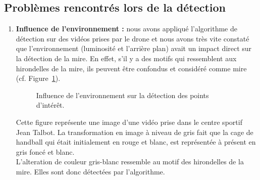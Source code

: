 \documentclass[12pt]{article}
\begin{document}
\subsection{Problèmes rencontrés lors de la détection}
\begin{enumerate}
        \item \textbf{Influence de l’environnement :}
nous avons appliqué l’algorithme de détection sur des vidéos prises par le drone et nous avons très vite constaté que l’environnement (luminosité et  l’arrière plan) avait un impact direct sur la détection de la mire. En effet, s’il y a des motifs qui ressemblent aux hirondelles de la mire, ils peuvent être confondus et considéré comme mire (cf. Figure~\ref{fig:environnement}).\\
\begin{figure}[H]
    \centering
    \qquad
    \caption{Influence de l'environnement sur la détection des points d'intérêt.}
    \label{fig:environnement}
\end{figure}

Cette figure représente une image d'une vidéo prise dans le centre sportif Jean Talbot. La transformation en image à niveau de gris fait que la cage de handball qui était initialement en rouge et blanc, est représentée à présent en gris foncé et blanc. \\ 
L'alteration de couleur gris-blanc ressemble au motif des hirondelles de la mire. Elles sont donc détectées par l'algorithme. 




\end{enumerate}
\end{document}
